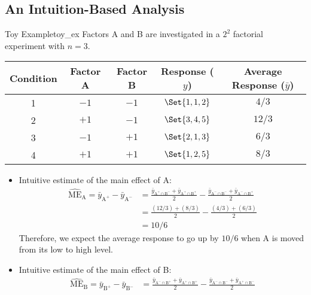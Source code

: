 \subsection{An Intuition-Based Analysis}
\begin{Example}{Toy Example}{toy_ex}
    Factors A and B are investigated in a $ 2^2 $ factorial experiment with $ n=3 $.
    \begin{center}
        \begin{NiceTabular}{ccc|cc}
            \toprule
            Condition & Factor A & Factor B & Response ($ y $) & Average Response ($ \bar{y} $)\\
             & $ -1 $ & $ -1 $ & $ \Set{1,1,2} $ & $ 4/3 $\\
            2 & $ +1 $ & $ -1 $ & $ \Set{3,4,5} $ & $ 12/3 $\\
            3 & $ -1 $ & $ +1 $ & $ \Set{2,1,3} $ & $ 6/3 $\\
            4 & $ +1 $ & $ +1 $ & $ \Set{1,2,5} $ & $ 8/3 $\\
            \bottomrule
        \end{NiceTabular}
    \end{center}
    \begin{itemize}
        \item Intuitive estimate of the main effect of A\@:
              \begin{align*}
                  \widehat{\text{ME}}_{\text{A}}=\bar{y}_{\text{A}^+}-\bar{y}_{\text{A}^-}
                   & =\frac{\bar{y}_{\text{A}^+\cap \text{B}^-}+\bar{y}_{\text{A}^+\cap \text{B}^+}}{2}
                  -\frac{\bar{y}_{\text{A}^-\cap \text{B}^-}+\bar{y}_{\text{A}^-\cap \text{B}^+}}{2}    \\
                   & =\frac{(12/3)+(8/3)}{2}-\frac{(4/3)+(6/3)}{2}                                      \\
                   & =10/6
              \end{align*}
              Therefore, we expect the average response to go up by $ 10/6 $ when A is moved from its low to high level.
        \item Intuitive estimate of the main effect of B\@:
              \begin{align*}
                  \widehat{\text{ME}}_{\text{B}}=\bar{y}_{\text{B}^+}-\bar{y}_{\text{B}^-}
                   & =\frac{\bar{y}_{\text{A}^-\cap \text{B}^+}+\bar{y}_{\text{A}^+\cap \text{B}^+}}{2}
                  -\frac{\bar{y}_{\text{A}^-\cap \text{B}^-}+\bar{y}_{\text{A}^+\cap \text{B}^-}}{2}    \\

\end{align*}
\end{itemize}
\end{Example}
